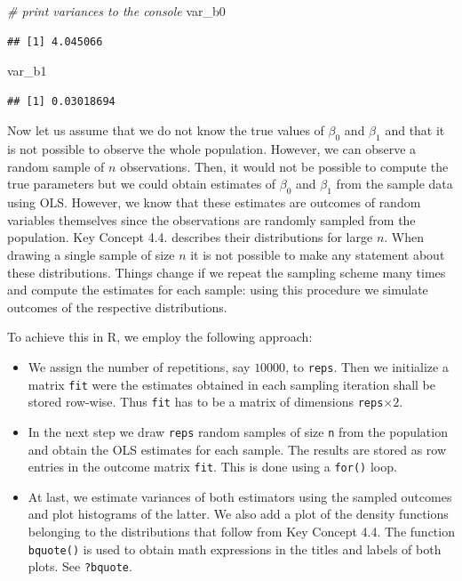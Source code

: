 \documentclass[]{book}
\newenvironment{Shaded}{\begin{snugshade}}{\end{snugshade}}
\newcommand{\CommentTok}[1]{\textcolor[rgb]{0.56,0.35,0.01}{\textit{#1}}}
\newcommand{\NormalTok}[1]{#1}
\providecommand{\tightlist}{%
  \setlength{\itemsep}{0pt}\setlength{\parskip}{0pt}}
\theoremstyle{definition}
\theoremstyle{definition}
\theoremstyle{definition}
\theoremstyle{remark}
\begin{document}
\begin{Shaded}
\begin{Highlighting}[]
\CommentTok{# print variances to the console}
\NormalTok{var_b0}
\end{Highlighting}
\end{Shaded}

\begin{verbatim}
## [1] 4.045066
\end{verbatim}

\begin{Shaded}
\begin{Highlighting}[]
\NormalTok{var_b1}
\end{Highlighting}
\end{Shaded}

\begin{verbatim}
## [1] 0.03018694
\end{verbatim}

Now let us assume that we do not know the true values of \(\beta_0\) and
\(\beta_1\) and that it is not possible to observe the whole population.
However, we can observe a random sample of \(n\) observations. Then, it
would not be possible to compute the true parameters but we could obtain
estimates of \(\beta_0\) and \(\beta_1\) from the sample data using OLS.
However, we know that these estimates are outcomes of random variables
themselves since the observations are randomly sampled from the
population. Key Concept 4.4. describes their distributions for large
\(n\). When drawing a single sample of size \(n\) it is not possible to
make any statement about these distributions. Things change if we repeat
the sampling scheme many times and compute the estimates for each
sample: using this procedure we simulate outcomes of the respective
distributions.

To achieve this in R, we employ the following approach:

\begin{itemize}
\tightlist
\item
  We assign the number of repetitions, say \(10000\), to \texttt{reps}.
  Then we initialize a matrix \texttt{fit} were the estimates obtained
  in each sampling iteration shall be stored row-wise. Thus \texttt{fit}
  has to be a matrix of dimensions \texttt{reps}\(\times2\).
\item
  In the next step we draw \texttt{reps} random samples of size
  \texttt{n} from the population and obtain the OLS estimates for each
  sample. The results are stored as row entries in the outcome matrix
  \texttt{fit}. This is done using a \texttt{for()} loop.
\item
  At last, we estimate variances of both estimators using the sampled
  outcomes and plot histograms of the latter. We also add a plot of the
  density functions belonging to the distributions that follow from Key
  Concept 4.4. The function \texttt{bquote()} is used to obtain math
  expressions in the titles and labels of both plots. See
  \texttt{?bquote}.
\end{itemize}
\end{document}
